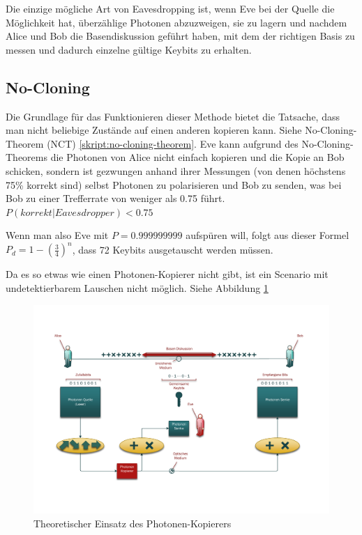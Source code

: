   Die einzige m\"ogliche Art von Eavesdropping ist, wenn Eve bei der Quelle die M\"oglichkeit hat, \"uberz\"ahlige Photonen abzuzweigen,
  sie zu lagern und nachdem Alice und Bob die Basendiskussion gef\"uhrt haben,
  mit dem der richtigen Basis zu messen und dadurch einzelne g\"ultige Keybits zu erhalten.

  \subsection{No-Cloning}
  Die Grundlage f\"ur das Funktionieren dieser Methode bietet die Tatsache, dass man nicht beliebige Zust\"ande auf einen anderen kopieren kann. Siehe No-Cloning-Theorem (NCT) \ref{skript:no-cloning-theorem}.
  Eve kann aufgrund des No-Cloning-Theorems die Photonen von Alice nicht einfach kopieren und die Kopie an Bob schicken,
  sondern ist gezwungen anhand ihrer Messungen (von denen h\"ochstens 75\% korrekt sind) selbst Photonen zu polarisieren
  und Bob zu senden, was bei Bob zu einer Trefferrate von weniger als 0.75 f\"uhrt.
  $P(korrekt|Eavesdropper)<0.75$

  Wenn man also Eve mit $P=0.999999999$ aufsp\"uren will,
  folgt aus dieser Formel $P_d = 1 - \left(\frac{3}{4}\right)^n$,
  dass 72 Keybits ausgetauscht werden m\"ussen.

  Da es so etwas wie einen Photonen-Kopierer nicht gibt, ist ein Scenario mit undetektierbarem Lauschen nicht m\"oglich. Siehe Abbildung \ref{crypto:BB84Clone}

  \begin{figure}
    \centering
    \includegraphics[height=0.35\textheight]{crypto/BB84Eve-Clone.pdf}
    \caption{Theoretischer Einsatz des Photonen-Kopierers\label{crypto:BB84Clone}}
  \end{figure}

